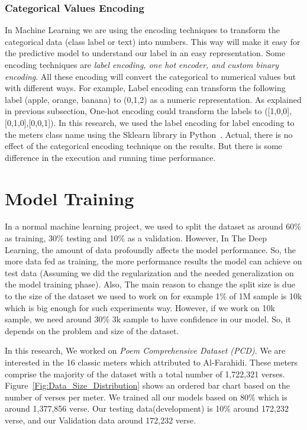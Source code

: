 \subsubsection{Categorical Values Encoding}\label{sec:label_encoder}

  In Machine Learning we are using the encoding techniques to transform the categorical data (class label or
text) into numbers. This way will make it easy for the predictive model to understand our label in an easy representation. Some encoding techniques are \textit{label encoding, one hot encoder, and custom binary encoding}. All these encoding will convert the categorical to numerical values but with different ways. For example, Label encoding can transform the following label (apple, orange, banana) to (0,1,2) as a numeric representation. As explained in previous subsection, One-hot encoding could transform the labels to ([1,0,0],[0,1,0],[0,0,1]). In this research, we used the label encoding for label encoding to the meters class name using the Sklearn library in Python~\cite{scikit-learn}. Actual, there is no effect of the categorical encoding technique on the results. But there is some difference in the execution and running time performance.

\clearpage

\section{Model Training}
In a normal machine learning project, we used to split the dataset as around 60\% as training, 30\% testing and 10\% as a validation. However, In The Deep Learning, the amount of data profoundly affects the model performance. So, the more data fed as training, the more performance results the model can achieve on test data (Assuming we did the regularization and the needed generalization on the model training phase). Also, The main reason to change the split size is due to the size of the dataset we used to work on for example 1\% of 1M sample is 10k which is big enough for such experiments way. However, if we work on 10k sample, we need around 30\% 3k sample to have confidence in our model. So, it depends on the problem and size of the dataset.

In this research, We worked on \textit{Poem Comprehensive Dataset (PCD)}\cite{ArabicpoetryDS}. We are interested in the 16 classic meters which attributed to Al-Farahidi. These meters comprise the majority of the dataset with a total number of 1,722,321 verses. Figure~\ref{Fig:Data_Size_Distribution} shows an ordered bar chart based on the number of verses per meter. We trained all our models based on 80\% which is around 1,377,856 verse. Our testing data(development) is 10\% around 172,232 verse, and our Validation data around 172,232 verse.

